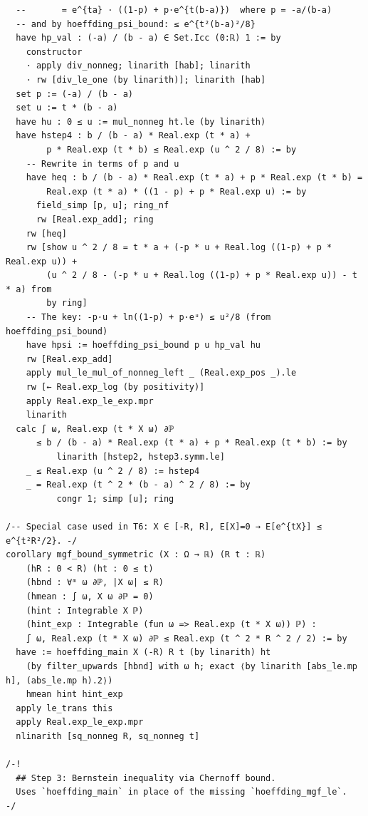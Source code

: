 \documentclass[11pt,a4paper]{article}
\theoremstyle{definition}
\theoremstyle{plain}
\theoremstyle{remark}
\begin{document}
\begin{leanblock}
\begin{lstlisting}
  --       = e^{ta} · ((1-p) + p·e^{t(b-a)})  where p = -a/(b-a)
  -- and by hoeffding_psi_bound: ≤ e^{t²(b-a)²/8}
  have hp_val : (-a) / (b - a) ∈ Set.Icc (0:ℝ) 1 := by
    constructor
    · apply div_nonneg; linarith [hab]; linarith
    · rw [div_le_one (by linarith)]; linarith [hab]
  set p := (-a) / (b - a)
  set u := t * (b - a)
  have hu : 0 ≤ u := mul_nonneg ht.le (by linarith)
  have hstep4 : b / (b - a) * Real.exp (t * a) +
        p * Real.exp (t * b) ≤ Real.exp (u ^ 2 / 8) := by
    -- Rewrite in terms of p and u
    have heq : b / (b - a) * Real.exp (t * a) + p * Real.exp (t * b) =
        Real.exp (t * a) * ((1 - p) + p * Real.exp u) := by
      field_simp [p, u]; ring_nf
      rw [Real.exp_add]; ring
    rw [heq]
    rw [show u ^ 2 / 8 = t * a + (-p * u + Real.log ((1-p) + p * Real.exp u)) +
        (u ^ 2 / 8 - (-p * u + Real.log ((1-p) + p * Real.exp u)) - t * a) from
        by ring]
    -- The key: -p·u + ln((1-p) + p·eᵘ) ≤ u²/8 (from hoeffding_psi_bound)
    have hpsi := hoeffding_psi_bound p u hp_val hu
    rw [Real.exp_add]
    apply mul_le_mul_of_nonneg_left _ (Real.exp_pos _).le
    rw [← Real.exp_log (by positivity)]
    apply Real.exp_le_exp.mpr
    linarith
  calc ∫ ω, Real.exp (t * X ω) ∂ℙ
      ≤ b / (b - a) * Real.exp (t * a) + p * Real.exp (t * b) := by
          linarith [hstep2, hstep3.symm.le]
    _ ≤ Real.exp (u ^ 2 / 8) := hstep4
    _ = Real.exp (t ^ 2 * (b - a) ^ 2 / 8) := by
          congr 1; simp [u]; ring

/-- Special case used in T6: X ∈ [-R, R], E[X]=0 → E[e^{tX}] ≤ e^{t²R²/2}. -/
corollary mgf_bound_symmetric (X : Ω → ℝ) (R t : ℝ)
    (hR : 0 < R) (ht : 0 ≤ t)
    (hbnd : ∀ᵐ ω ∂ℙ, |X ω| ≤ R)
    (hmean : ∫ ω, X ω ∂ℙ = 0)
    (hint : Integrable X ℙ)
    (hint_exp : Integrable (fun ω => Real.exp (t * X ω)) ℙ) :
    ∫ ω, Real.exp (t * X ω) ∂ℙ ≤ Real.exp (t ^ 2 * R ^ 2 / 2) := by
  have := hoeffding_main X (-R) R t (by linarith) ht
    (by filter_upwards [hbnd] with ω h; exact ⟨by linarith [abs_le.mp h], (abs_le.mp h).2⟩)
    hmean hint hint_exp
  apply le_trans this
  apply Real.exp_le_exp.mpr
  nlinarith [sq_nonneg R, sq_nonneg t]

/-!
  ## Step 3: Bernstein inequality via Chernoff bound.
  Uses `hoeffding_main` in place of the missing `hoeffding_mgf_le`.
-/


\end{lstlisting}
\end{leanblock}
\end{document}
